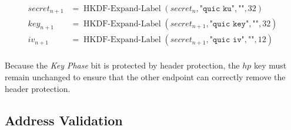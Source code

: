 \begin{equation*}
  \begin{split}
  secret_{n+1} & = \operatorname{HKDF-Expand-Label}(secret_{n}, \texttt{"quic ku"}, \texttt{""}, 32) \\
  key_{n+1} & = \operatorname{HKDF-Expand-Label}(secret_{n+1}, \texttt{"quic key"}, \texttt{""}, 32) \\
  iv_{n+1}  & = \operatorname{HKDF-Expand-Label}(secret_{n+1}, \texttt{"quic iv"}, \texttt{""}, 12)  \\
  \end{split}
\end{equation*}

Because the \textit{Key Phase} bit is protected by header protection, the $hp$ key must remain
unchanged to ensure that the other endpoint can correctly remove the header protection.

\subsection{Address Validation}
